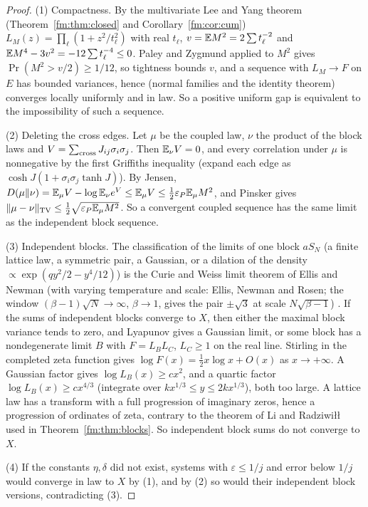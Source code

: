 \begin{proof}
(1) Compactness. By the multivariate Lee and Yang theorem (Theorem~\ref{fm:thm:closed} and Corollary~\ref{fm:cor:cum}) $L_M(z)=\prod_\ell(1+z^2/t_\ell^2)$ with real $t_\ell$, $v=\mathbb{E} M^2=2\sum t_\ell^{-2}$ and $\mathbb{E} M^4-3v^2=-12\sum t_\ell^{-4}\le0$. Paley and Zygmund applied to $M^2$ gives $\Pr(M^2>v/2)\ge1/12$, so tightness bounds $v$, and a sequence with $L_M\to F$ on $E$ has bounded variances, hence (normal families and the identity theorem) converges locally uniformly and in law. So a positive uniform gap is equivalent to the impossibility of such a sequence.

(2) Deleting the cross edges. Let $\mu$ be the coupled law, $\nu$ the product of the block laws and $V=\sum_{\rm cross}J_{ij}\sigma_i\sigma_j$. Then $\mathbb{E}_\nu V=0$, and every correlation under $\mu$ is nonnegative by the first Griffiths inequality (expand each edge as $\cosh J(1+\sigma_i\sigma_j\tanh J)$). By Jensen, $D(\mu\Vert\nu)=\mathbb{E}_\mu V-\log\mathbb{E}_\nu e^V\le\mathbb{E}_\mu V\le\frac12\varepsilon_P\mathbb{E}_\mu M^2$, and Pinsker gives $\Vert\mu-\nu\Vert_{\rm TV}\le\frac12\sqrt{\varepsilon_P\mathbb{E}_\mu M^2}$. So a convergent coupled sequence has the same limit as the independent block sequence.

(3) Independent blocks. The classification of the limits of one block $aS_N$ (a finite lattice law, a symmetric pair, a Gaussian, or a dilation of the density $\propto\exp(qy^2/2-y^4/12)$) is the Curie and Weiss limit theorem of Ellis and Newman (with varying temperature and scale: Ellis, Newman and Rosen; the window $(\beta-1)\sqrt N\to\infty$, $\beta\to1$, gives the pair $\pm\sqrt3$ at scale $N\sqrt{\beta-1}$) %
. If the sums of independent blocks converge to $X$, then either the maximal block variance tends to zero, and Lyapunov gives a Gaussian limit, or some block has a nondegenerate limit $B$ with $F=L_BL_C$, $L_C\ge1$ on the real line. Stirling in the completed zeta function gives $\log F(x)=\frac12x\log x+O(x)$ as $x\to+\infty$. A Gaussian factor gives $\log L_B(x)\ge cx^2$, and a quartic factor $\log L_B(x)\ge cx^{4/3}$ (integrate over $kx^{1/3}\le y\le2kx^{1/3}$), both too large. A lattice law has a transform with a full progression of imaginary zeros, hence a progression of ordinates of zeta, contrary to the theorem of Li and Radziwi\l\l\ \cite{LiRad15} used in Theorem~\ref{fm:thm:blocks}. So independent block sums do not converge to $X$.

(4) If the constants $\eta,\delta$ did not exist, systems with $\varepsilon\le1/j$ and error below $1/j$ would converge in law to $X$ by (1), and by (2) so would their independent block versions, contradicting (3).
\end{proof}

